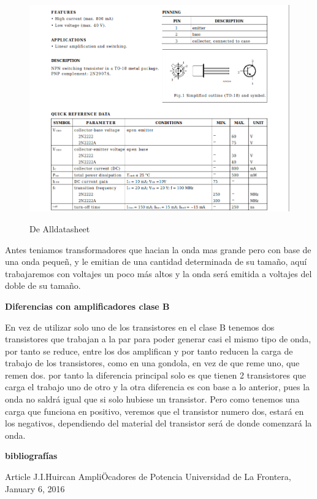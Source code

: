 \documentclass[letterpaper]{article}
\begin{document}
\begin{large}
\begin{figure}[hbtp]
\caption{De Alldatasheet}
\centering
\includegraphics[scale=.5]{Imagenes/data.png}\\
\end{figure}
Antes teniamos transformadores que hacian la onda mas grande pero con base de una onda pequeñ, y le emitian de una cantidad determinada de su tamaño, aquí trabajaremos con voltajes un poco más altos y la onda será emitida a voltajes del doble de su tamaño.

\begin{huge}
\begin{center}
\textbf{Diferencias con amplificadores clase B}
\end{center}
\end{huge}
En vez de utilizar solo uno de los transistores en el clase B tenemos dos transistores que trabajan a la par para poder generar casi el mismo tipo de onda, por tanto se reduce, entre los dos amplifican y por tanto reducen la carga de trabajo de los transistores, como en una gondola, en vez de que reme uno, que remen dos.
por tanto la diferencia principal solo es que tienen 2 transistores que carga el trabajo uno de otro y la otra diferencia es con base a lo anterior, pues la onda no saldrá igual que si solo hubiese un transistor.
\newpage
Pero como tenemos una carga que funciona en positivo, veremos que el transistor numero dos, estará en los negativos, dependiendo del material del transistor será de donde comenzará la onda.


\begin{center}
\textbf{bibliografías}
\end{center}
Article
 J.I.Huircan AmpliÖcadores de Potencia Universidad de La Frontera, January 6, 2016


\end{large}
\end{document}
